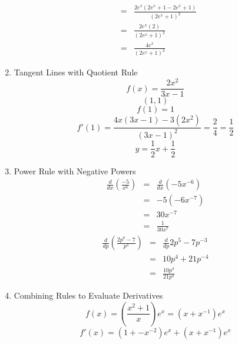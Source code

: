 \documentclass{article}
\begin{document}
\begin{enumerate}
\begin{eqnarray}
        &=& \frac{2e^x(2e^x + 1 - 2e^x + 1)}{(2e^x + 1)^2} \\
        &=& \frac{2e^x(2)}{(2e^x + 1)^2} \\
        &=& \frac{4e^x}{(2e^x + 1)^2}
    \end{eqnarray}
    \item Tangent Lines with Quotient Rule
    $$f(x) = \frac{2x^2}{3x - 1}$$
    $$(1, 1)$$
    $$f(1) = 1$$
    $$f'(1) = \frac{4x(3x - 1) - 3(2x^2)}{(3x - 1)^2} = \frac{2}{4} = \frac{1}{2}$$
    $$y = \frac{1}{2}x + \frac{1}{2}$$
    \item Power Rule with Negative Powers
    \begin{eqnarray}
        \frac{d}{dx}\left(\frac{-5}{x^6}\right) &=& \frac{d}{dx}\left(-5x^{-6}\right) \\
        &=& -5\left(-6x^{-7}\right) \\
        &=& 30x^{-7} \\
        &=& \frac{1}{30x^{7}}
    \end{eqnarray}
    \begin{eqnarray}
    \frac{d}{dp}\left(\frac{2p^8 - 7}{p^3}\right) &=& \frac{d}{dp}2p^5 - 7p^{-3} \\
    &=& 10p^4 + 21p^{-4} \\
    &=& \frac{10p^4}{21p^4}
    \end{eqnarray}
    \item Combining Rules to Evaluate Derivatives
        $$f(x) = \left(\frac{x^2 + 1}{x}\right)e^x = \left(x + x^{-1}\right)e^x$$
        $$f'(x) = \left(1 + -x^{-2}\right)e^x + \left(x + x^{-1}\right)e^x$$
\end{enumerate}
\end{document}
